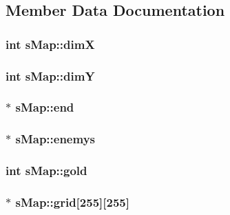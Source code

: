 \subsection{Member Data Documentation}
\hypertarget{structs_map_a9ba71dc7a7b6eeb28048a66493c620d4}{
\subsubsection[{dim\-X}]{\setlength{\rightskip}{0pt plus 5cm}int s\-Map\-::dim\-X}}\label{structs_map_a9ba71dc7a7b6eeb28048a66493c620d4}
\hypertarget{structs_map_a3f0d31fe9f43386379f2eece819cad01}{
\subsubsection[{dim\-Y}]{\setlength{\rightskip}{0pt plus 5cm}int s\-Map\-::dim\-Y}}\label{structs_map_a3f0d31fe9f43386379f2eece819cad01}
\hypertarget{structs_map_af32a1725ce537428fb1927a1fbb967fd}{
\subsubsection[{end}]{$\ast$ s\-Map\-::end}}\label{structs_map_af32a1725ce537428fb1927a1fbb967fd}
\hypertarget{structs_map_a7319b51da24fb022fa90806e9cd7bd76}{
\subsubsection[{enemys}]{$\ast$ s\-Map\-::enemys}}\label{structs_map_a7319b51da24fb022fa90806e9cd7bd76}
\hypertarget{structs_map_a2751a189d93f2aead4161dab37878ff2}{
\subsubsection[{gold}]{\setlength{\rightskip}{0pt plus 5cm}int s\-Map\-::gold}}\label{structs_map_a2751a189d93f2aead4161dab37878ff2}
\hypertarget{structs_map_a5c09c94b17e9241ec28aba0407808aff}{
\subsubsection[{grid}]{$\ast$ s\-Map\-::grid\mbox{[}255\mbox{]}\mbox{[}255\mbox{]}}}\label{structs_map_a5c09c94b17e9241ec28aba0407808aff}
